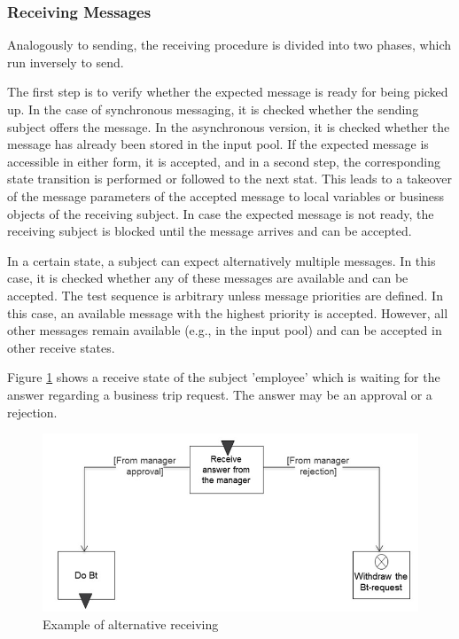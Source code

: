 
\subsubsection{Receiving Messages}

Analogously to sending, the receiving procedure is divided into two phases, which run inversely to send.

The first step is to verify whether the expected message is ready for being picked up. In the case of synchronous messaging, it is checked whether the sending subject offers the message. In the asynchronous version, it is checked whether the message has already been stored in the input pool. If the expected message is accessible in either form, it is accepted, and in a second step, the corresponding state transition is performed or followed to the next stat. This leads to a takeover of the message parameters of the accepted message to local variables or business objects of the receiving subject. In case the expected message is not ready, the receiving subject is blocked until the message arrives and can be accepted.

In a certain state, a subject can expect alternatively multiple messages. In this case, it is checked whether any of these messages are available and can be accepted. The test sequence is arbitrary unless message priorities are defined. In this case, an available message with the highest priority is accepted. However, all other messages remain available (e.g., in the input pool) and can be accepted in other receive states.

Figure \ref{fig:receivestate} shows a receive state of the subject 'employee' which is waiting for the answer regarding a business trip request. The answer may be an approval or a rejection.

\begin{figure}[htbp]
	\centering
	\includegraphics[width=0.7\linewidth]{Figures/Ontology/SubjectBehavior/ReceiveState}
	\caption[Example of alternative receiving]{Example of alternative receiving}
	\label{fig:receivestate}
\end{figure}

